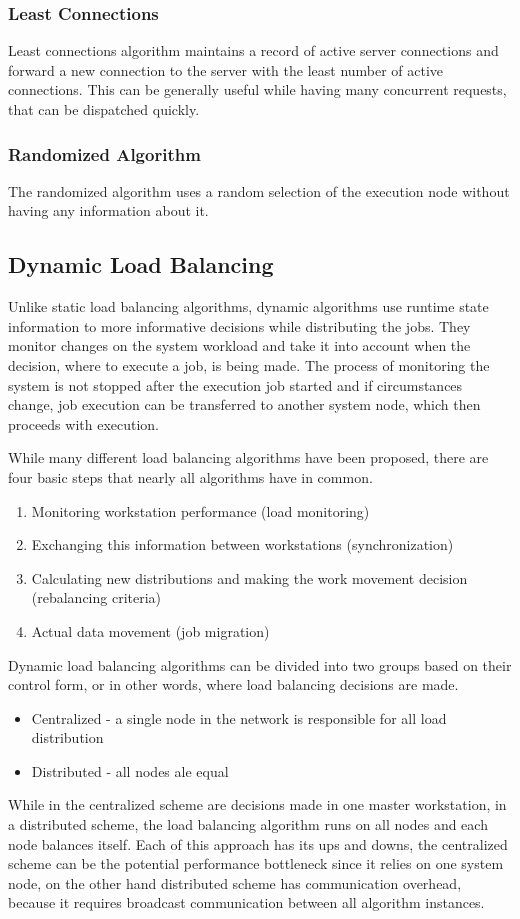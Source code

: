 \subsubsection{Least Connections}
Least connections algorithm maintains a record of active server connections
and forward a new connection to the server with the least number of active connections\cite{web:ibmLoadBalancingDecisions}.
This can be generally useful while having many concurrent requests, that can be dispatched quickly.

\subsubsection{Randomized Algorithm}
The randomized algorithm uses a random selection of the execution node without having any information about it.

\subsection{Dynamic Load Balancing}\label{subsec:dynamic-load-balancing}
Unlike static load balancing algorithms, dynamic algorithms use runtime state information to more informative decisions while distributing the jobs.
They monitor changes on the system workload and take it into account when the decision, where to execute a job, is being made.
The process of monitoring the system is not stopped after the execution job started and if circumstances change,
job execution can be transferred to another system node, which then proceeds with execution.

While many different load balancing algorithms have been proposed, there are four basic steps that nearly all algorithms have in common\cite{malik2000dynamic}.
\begin{enumerate}
    \item Monitoring workstation performance (load monitoring)
    \item Exchanging this information between workstations (synchronization)
    \item Calculating new distributions and making the work movement decision (rebalancing criteria)
    \item Actual data movement (job migration)
\end{enumerate}
Dynamic load balancing algorithms can be divided into two groups based on their control form,
or in other words, where load balancing decisions are made\cite{malik2000dynamic}.
\begin{itemize}
    \item Centralized - a single node in the network is responsible for all load distribution
    \item Distributed - all nodes ale equal
\end{itemize}
While in the centralized scheme are decisions made in one master workstation,
in a distributed scheme, the load balancing algorithm runs on all nodes
and each node balances itself.
Each of this approach has its ups and downs,
the centralized scheme can be the potential performance bottleneck
since it relies on one system node,
on the other hand distributed scheme has communication overhead,
because it requires broadcast communication between all algorithm instances.


